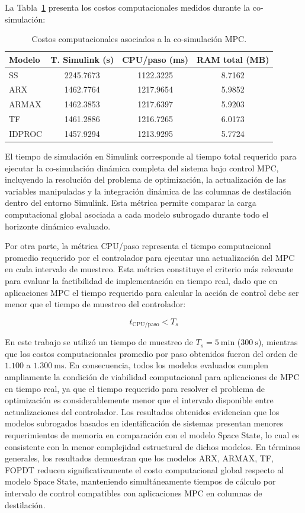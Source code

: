 La Tabla~\ref{tab:CostosComputacionales} presenta los costos computacionales medidos
durante la co-simulación: 

\begin{table}[htbp]
\centering
\caption{Costos computacionales asociados a la co-simulación MPC.}
\label{tab:CostosComputacionales}
\small
\begin{tabular}{lccc}
\toprule
Modelo & T. Simulink (s) & CPU/paso (ms) & RAM total (MB) \\
\midrule
SS     & 2245.7673 & 1122.3225 & 8.7162 \\
ARX    & 1462.7764 & 1217.9654 & 5.9852 \\
ARMAX  & 1462.3853 & 1217.6397 & 5.9203 \\
TF     & 1461.2886 & 1216.7265 & 6.0173 \\
IDPROC & 1457.9294 & 1213.9295 & 5.7724 \\
\bottomrule
\end{tabular}
\end{table}


El tiempo de simulación en Simulink corresponde al tiempo total requerido para ejecutar la co-simulación dinámica completa del sistema bajo control MPC, incluyendo la resolución del problema de optimización, la actualización de las variables manipuladas y la integración dinámica de las columnas de destilación dentro del entorno Simulink. Esta métrica permite comparar la carga computacional global asociada a cada modelo subrogado durante todo el horizonte dinámico evaluado.

Por otra parte, la métrica CPU/paso representa el tiempo computacional promedio requerido por el controlador para ejecutar una actualización del MPC en cada intervalo de muestreo. Esta métrica constituye el criterio más relevante para evaluar la factibilidad de implementación en tiempo real, dado que en aplicaciones MPC el tiempo requerido para calcular la acción de control debe ser menor que el tiempo de muestreo del controlador:

\[t_{\mathrm{CPU/paso}} < T_s\]

En este trabajo se utilizó un tiempo de muestreo de \(T_s = 5\ \mathrm{min}\) (\(300\ \mathrm{s}\)), mientras que los costos computacionales promedio por paso obtenidos fueron del orden de \(1.100\) a \(1.300\ \mathrm{ms}\). En consecuencia, todos los modelos evaluados cumplen ampliamente la condición de viabilidad computacional para aplicaciones de MPC en tiempo real, ya que el tiempo requerido para resolver el problema de optimización es considerablemente menor que el intervalo disponible entre actualizaciones del controlador. Los resultados obtenidos evidencian que los modelos subrogados basados en identificación de sistemas presentan menores requerimientos de memoria en comparación con el modelo Space State, lo cual es consistente con la menor complejidad estructural de dichos modelos. En términos generales, los resultados demuestran que los modelos ARX, ARMAX, TF, FOPDT reducen significativamente el costo computacional global respecto al modelo Space State, manteniendo simultáneamente tiempos de cálculo por intervalo de control compatibles con aplicaciones MPC en columnas de destilación. 


